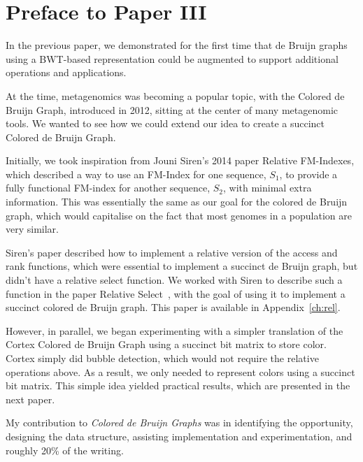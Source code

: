 \chapter*{Preface to Paper III}

In the previous paper, we demonstrated for the first time that de Bruijn graphs using a BWT-based representation could be augmented to support additional operations and applications.

At the time, metagenomics was becoming a popular topic, with the Colored de Bruijn Graph, introduced in 2012, sitting at the center of many metagenomic tools. We wanted to see how we could extend our idea to create a succinct Colored de Bruijn Graph.

Initially, we took inspiration from Jouni Siren's 2014 paper Relative FM-Indexes, which described a way to use an FM-Index for one sequence, $S_1$, to provide a fully functional FM-index for another sequence, $S_2$, with minimal extra information. This was essentially the same as our goal for the colored de Bruijn graph, which would capitalise on the fact that most genomes in a population are very similar.

Siren's paper described how to implement a relative version of the access and rank functions, which were essential to implement a succinct de Bruijn graph, but didn't have a relative select function. We worked with Siren to describe such a function in the paper Relative Select~\cite{boucher15}, with the goal of using it to implement a succinct colored de Bruijn graph. This paper is available in Appendix~\ref{ch:rel}.

However, in parallel, we began experimenting with a simpler translation of the Cortex Colored de Bruijn Graph using a succinct bit matrix to store color. Cortex simply did bubble detection, which would not require the relative operations above. As a result, we only needed to represent colors using a succinct bit matrix. This simple idea yielded practical results, which are presented in the next paper.

My contribution to \textit{Colored de Bruijn Graphs} was in identifying the opportunity, designing the data structure, assisting implementation and experimentation, and roughly 20\% of the writing.